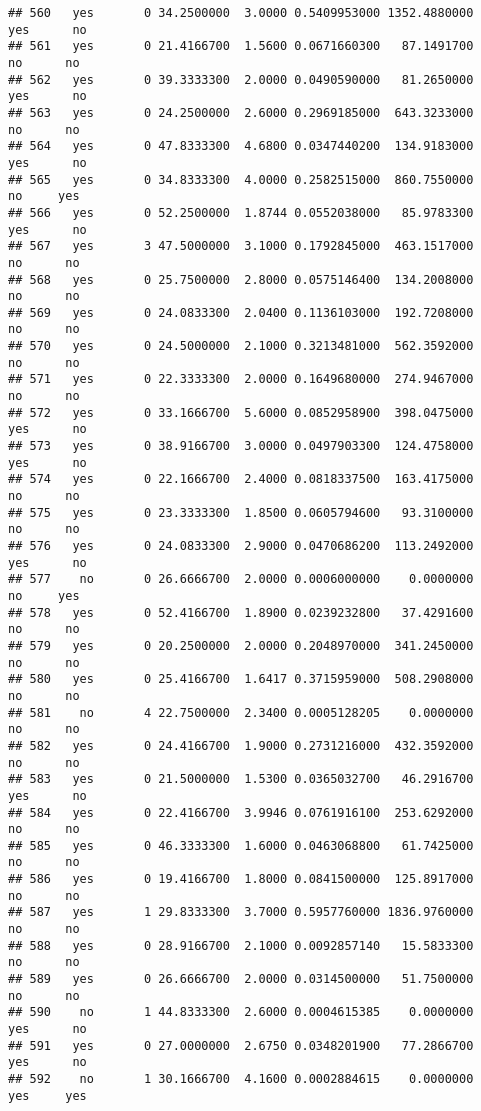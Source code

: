 \documentclass[]{article}
\begin{document}
\begin{verbatim}
## 560   yes       0 34.2500000  3.0000 0.5409953000 1352.4880000   yes      no
## 561   yes       0 21.4166700  1.5600 0.0671660300   87.1491700    no      no
## 562   yes       0 39.3333300  2.0000 0.0490590000   81.2650000   yes      no
## 563   yes       0 24.2500000  2.6000 0.2969185000  643.3233000    no      no
## 564   yes       0 47.8333300  4.6800 0.0347440200  134.9183000   yes      no
## 565   yes       0 34.8333300  4.0000 0.2582515000  860.7550000    no     yes
## 566   yes       0 52.2500000  1.8744 0.0552038000   85.9783300   yes      no
## 567   yes       3 47.5000000  3.1000 0.1792845000  463.1517000    no      no
## 568   yes       0 25.7500000  2.8000 0.0575146400  134.2008000    no      no
## 569   yes       0 24.0833300  2.0400 0.1136103000  192.7208000    no      no
## 570   yes       0 24.5000000  2.1000 0.3213481000  562.3592000    no      no
## 571   yes       0 22.3333300  2.0000 0.1649680000  274.9467000    no      no
## 572   yes       0 33.1666700  5.6000 0.0852958900  398.0475000   yes      no
## 573   yes       0 38.9166700  3.0000 0.0497903300  124.4758000   yes      no
## 574   yes       0 22.1666700  2.4000 0.0818337500  163.4175000    no      no
## 575   yes       0 23.3333300  1.8500 0.0605794600   93.3100000    no      no
## 576   yes       0 24.0833300  2.9000 0.0470686200  113.2492000   yes      no
## 577    no       0 26.6666700  2.0000 0.0006000000    0.0000000    no     yes
## 578   yes       0 52.4166700  1.8900 0.0239232800   37.4291600    no      no
## 579   yes       0 20.2500000  2.0000 0.2048970000  341.2450000    no      no
## 580   yes       0 25.4166700  1.6417 0.3715959000  508.2908000    no      no
## 581    no       4 22.7500000  2.3400 0.0005128205    0.0000000    no      no
## 582   yes       0 24.4166700  1.9000 0.2731216000  432.3592000    no      no
## 583   yes       0 21.5000000  1.5300 0.0365032700   46.2916700   yes      no
## 584   yes       0 22.4166700  3.9946 0.0761916100  253.6292000    no      no
## 585   yes       0 46.3333300  1.6000 0.0463068800   61.7425000    no      no
## 586   yes       0 19.4166700  1.8000 0.0841500000  125.8917000    no      no
## 587   yes       1 29.8333300  3.7000 0.5957760000 1836.9760000    no      no
## 588   yes       0 28.9166700  2.1000 0.0092857140   15.5833300    no      no
## 589   yes       0 26.6666700  2.0000 0.0314500000   51.7500000    no      no
## 590    no       1 44.8333300  2.6000 0.0004615385    0.0000000   yes      no
## 591   yes       0 27.0000000  2.6750 0.0348201900   77.2866700   yes      no
## 592    no       1 30.1666700  4.1600 0.0002884615    0.0000000   yes     yes

\end{verbatim}
\end{document}
